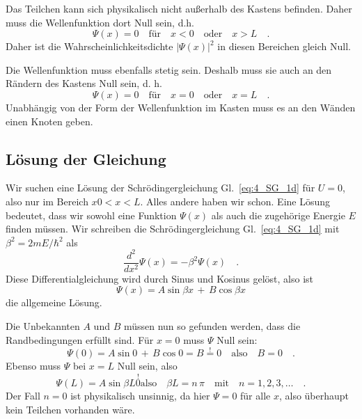 Das Teilchen kann sich physikalisch nicht außerhalb des Kastens befinden. Daher muss die Wellenfunktion dort Null sein, d.h.
\begin{equation}
    \Psi(x) = 0 \quad \text{für} \quad x < 0  \quad \text{oder} \quad x > L \quad .
 \end{equation}
 Daher ist die Wahrscheinlichkeitsdichte $|\Psi(x)|^2$ in diesen Bereichen gleich Null.

Die Wellenfunktion muss ebenfalls stetig sein. Deshalb muss sie auch an den Rändern des Kastens Null sein, d. h.
\begin{equation}
    \Psi(x) = 0 \quad \text{für} \quad x = 0  \quad \text{oder} \quad x = L \quad .
 \end{equation}
 Unabhängig von der Form der Wellenfunktion im Kasten muss es an den Wänden einen Knoten geben.



\subsection{Lösung der Gleichung}

Wir suchen eine Lösung der Schrödingergleichung Gl.~\ref{eq:4_SG_1d} für $U=0$, also nur im Bereich $x0<x<L$. Alles andere haben wir schon. Eine Lösung bedeutet, dass wir sowohl eine Funktion $\Psi(x)$ als auch die zugehörige Energie $E$ finden müssen.
Wir schreiben die Schrödingergleichung Gl.~\ref{eq:4_SG_1d} mit $\beta^2 = 2 m E / \hbar^2$ als
\begin{equation}
    \frac{d^2}{dx^2} \Psi(x) = - \beta^2 \Psi(x)  \quad .
  \end{equation}
Diese Differentialgleichung wird durch Sinus und Kosinus gelöst, also ist 
\begin{equation}
    \Psi(x) = A \sin \beta x  \, + \, B \cos \beta x
\end{equation}
die allgemeine Lösung. 

Die Unbekannten $A$ und $B$ müssen nun so gefunden werden, dass die Randbedingungen erfüllt sind. Für $x=0$ muss $\Psi$ Null sein:
\begin{equation}
    \Psi(0) =  A \sin   0  \, + \, B \cos   0 = B \overset{!}{=} 0 \quad \text{also} \quad B = 0 \quad .
\end{equation}
Ebenso muss $\Psi$ bei $x=L$ Null sein, also 
\begin{equation}
    \Psi(L) = A \sin \beta L \overset{!}{0} \text{also} \quad \beta L = n \, \pi \quad \text{mit} \quad n = 1, 2, 3, \dots \quad .
\end{equation}
Der Fall $n=0$ ist physikalisch unsinnig, da hier $\Psi = 0$ für alle $x$, also überhaupt kein Teilchen vorhanden wäre.

